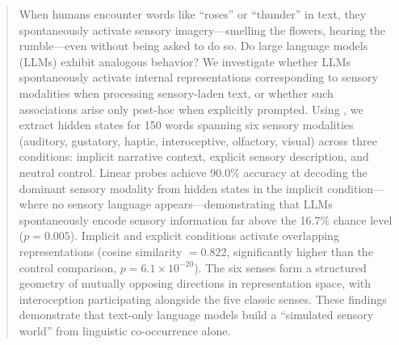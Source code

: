 \begin{abstract}
When humans encounter words like ``roses'' or ``thunder'' in text, they spontaneously activate sensory imagery---smelling the flowers, hearing the rumble---even without being asked to do so. Do large language models (LLMs) exhibit analogous behavior? We investigate whether LLMs spontaneously activate internal representations corresponding to sensory modalities when processing sensory-laden text, or whether such associations arise only post-hoc when explicitly prompted. Using \qwen, we extract hidden states for 150 words spanning six sensory modalities (auditory, gustatory, haptic, interoceptive, olfactory, visual) across three conditions: implicit narrative context, explicit sensory description, and neutral control. Linear probes achieve 90.0\% accuracy at decoding the dominant sensory modality from hidden states in the implicit condition---where no sensory language appears---demonstrating that LLMs spontaneously encode sensory information far above the 16.7\% chance level ($p = 0.005$). Implicit and explicit conditions activate overlapping representations (cosine similarity $= 0.822$, significantly higher than the control comparison, $p = 6.1 \times 10^{-20}$). The six senses form a structured geometry of mutually opposing directions in representation space, with interoception participating alongside the five classic senses. These findings demonstrate that text-only language models build a ``simulated sensory world'' from linguistic co-occurrence alone.
\end{abstract}
